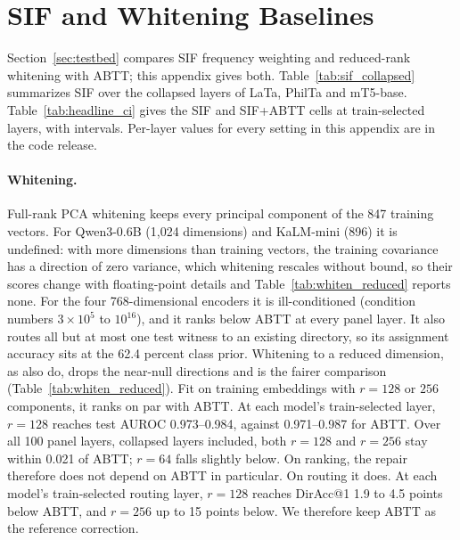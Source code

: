 \documentclass[11pt]{article}
\begin{document}


\FloatBarrier
\section{SIF and Whitening Baselines}
\label{app:sif_variants}

Section~\ref{sec:testbed} compares SIF frequency weighting and reduced-rank whitening with ABTT; this appendix gives both.
Table~\ref{tab:sif_collapsed} summarizes SIF over the collapsed layers of LaTa, PhilTa and mT5-base.
Table~\ref{tab:headline_ci} gives the SIF and SIF+ABTT cells at train-selected layers, with intervals.
Per-layer values for every setting in this appendix are in the code release.

\paragraph{Whitening.}
Full-rank PCA whitening \citep{su2021whitening} keeps every principal component of the 847 training vectors.
For Qwen3-0.6B (1,024 dimensions) and KaLM-mini (896) it is undefined: with more dimensions than training vectors, the training covariance has a direction of zero variance, which whitening rescales without bound, so their scores change with floating-point details and Table~\ref{tab:whiten_reduced} reports none.
For the four 768-dimensional encoders it is ill-conditioned (condition numbers $3\times10^{5}$ to $10^{16}$), and it ranks below ABTT at every panel layer.
It also routes all but at most one test witness to an existing directory, so its assignment accuracy sits at the 62.4 percent class prior.
Whitening to a reduced dimension, as \citet{su2021whitening} also do, drops the near-null directions and is the fairer comparison (Table~\ref{tab:whiten_reduced}).
Fit on training embeddings with $r=128$ or $256$ components, it ranks on par with ABTT.
At each model's train-selected layer, $r=128$ reaches test AUROC 0.973--0.984, against 0.971--0.987 for ABTT.
Over all 100 panel layers, collapsed layers included, both $r=128$ and $r=256$ stay within 0.021 of ABTT; $r=64$ falls slightly below.
On ranking, the repair therefore does not depend on ABTT in particular.
On routing it does.
At each model's train-selected routing layer, $r=128$ reaches DirAcc@1 1.9 to 4.5 points below ABTT, and $r=256$ up to 15 points below.
We therefore keep ABTT as the reference correction.




\FloatBarrier
\end{document}

